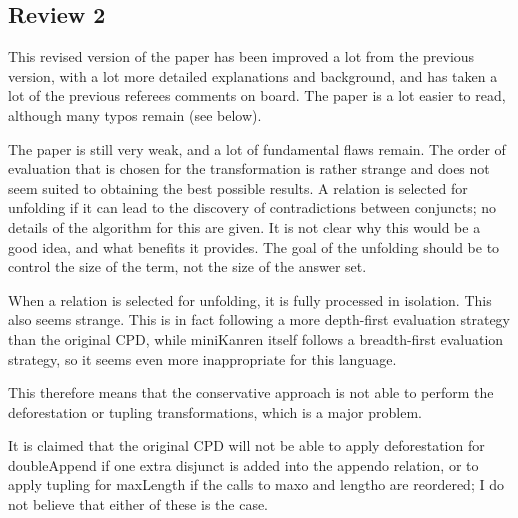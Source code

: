 
\subsection*{Review 2}


This revised version of the paper has been improved a lot from the previous version, with a lot more
detailed explanations and background, and has taken a lot of the previous referees comments on board.
The paper is a lot easier to read, although many typos remain (see below).

The paper is still very weak, and a lot of fundamental flaws remain. The order of evaluation that is
chosen for the transformation is rather strange and does not seem suited to obtaining the best possible
results. A relation is selected for unfolding if it can lead to the discovery of contradictions between conjuncts;
no details of the algorithm for this are given. It is not clear why this would be a good idea, and what benefits
it provides. The goal of the unfolding should be to control the size of the term, not the size of the answer set.


When a relation is selected for unfolding, it is fully processed in isolation. This also seems strange. This is
in fact following a more depth-first evaluation strategy than the original CPD, while miniKanren itself follows
a breadth-first evaluation strategy, so it seems even more inappropriate for this language.


This therefore means
that the conservative approach is not able to perform the deforestation or tupling transformations, which is a
major problem.


It is claimed that the original CPD will not be able to apply deforestation for doubleAppend if
one extra disjunct is added into the appendo relation, or to apply tupling for maxLength if the calls to maxo and
lengtho are reordered; I do not believe that either of these is the case.

